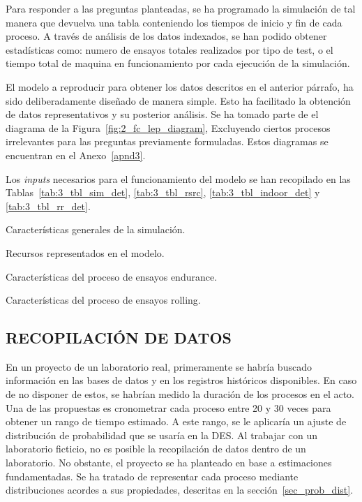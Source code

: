 Para responder a las preguntas planteadas,
se ha programado la simulación de tal manera que devuelva una tabla
conteniendo los tiempos de inicio y fin de cada proceso.
A través de análisis de los datos indexados,
se han podido obtener estadísticas como:
numero de ensayos totales realizados por tipo de test,
o el tiempo total de maquina en funcionamiento
por cada ejecución de la simulación.

El modelo a reproducir para obtener los datos descritos	en el anterior párrafo,
ha sido deliberadamente diseñado de manera simple.
Esto ha facilitado la obtención de datos representativos
y su posterior análisis.
Se ha tomado parte de el diagrama de la Figura~\ref{fig:2_fc_lep_diagram},
Excluyendo ciertos procesos irrelevantes
para las preguntas previamente formuladas.
Estos diagramas se encuentran en el Anexo~\ref{apnd3}.

Los \textit{inputs} necesarios para el funcionamiento del modelo
se han recopilado en las Tablas~\ref{tab:3_tbl_sim_det},
\ref{tab:3_tbl_rsrc},
\ref{tab:3_tbl_indoor_det}
y \ref{tab:3_tbl_rr_det}.

\begin{table}[H]
	\centering
	\caption{Características generales de la simulación.}
	
	\label{tab:3_tbl_sim_det}
\end{table}

\begin{table}[H]
	\centering
	\caption{Recursos representados en el modelo.}
	
	\label{tab:3_tbl_rsrc}
\end{table}

\begin{table}
	\centering
	\caption{Características del proceso de ensayos endurance.}
	
	\label{tab:3_tbl_indoor_det}
\end{table}

\begin{table}
	\centering
	\caption{Características del proceso de ensayos rolling.}
	
	\label{tab:3_tbl_rr_det}
\end{table}


\subsection{RECOPILACIÓN DE DATOS}

En un proyecto de un laboratorio real,
primeramente se habría buscado información en las bases de datos y en los registros históricos disponibles.
En caso de no disponer de estos,
se habrían medido la duración de los procesos en el acto.
Una de las propuestas es cronometrar cada proceso entre 20 y 30 veces
para obtener un rango de tiempo estimado.
A este rango, se le aplicaría un
ajuste de distribución de probabilidad que se usaría en la DES.
Al trabajar con un laboratorio ficticio,
no es posible la recopilación de datos dentro de un laboratorio.
No obstante, el proyecto se ha planteado en base a estimaciones fundamentadas.
Se ha tratado de representar cada proceso mediante
distribuciones acordes a sus propiedades,
descritas en la sección~\ref{sec_prob_dist}.

